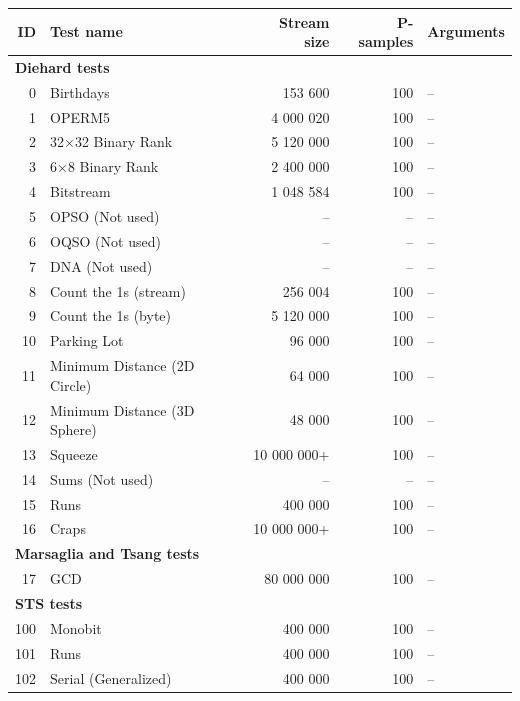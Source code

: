 \documentclass[
  digital,  	%
  color,		%
  oneside,   	%
  12pt,
  nocover,
  notable,
  nolof,
  nolot,
]{fithesis3}
\begin{document}
\begin{nomar}
\centering
\begin{tabular}{r | l | r | r | l}
\textbf{ID} & \textbf{Test name} & \textbf{Stream size} & \textbf{P-samples} & \textbf{Arguments} \\ \hline \hline
\multicolumn{5}{l}{\textbf{Diehard tests}} \\ \hline
0   & Birthdays                    &    153 600 & 100 & -- \\
1   & OPERM5                       &  4 000 020 & 100 & -- \\
2   & 32$\times$32 Binary Rank     &  5 120 000 & 100 & -- \\
3   & 6$\times$8 Binary Rank       &  2 400 000 & 100 & -- \\
4   & Bitstream                    &  1 048 584 & 100 & -- \\
5   & OPSO (Not used)              &         -- & --  & -- \\
6   & OQSO (Not used)              &         -- & --  & -- \\
7   & DNA  (Not used)              &         -- & --  & -- \\
8   & Count the 1s (stream)        &    256 004 & 100 & -- \\
9   & Count the 1s (byte)          &  5 120 000 & 100 & -- \\
10  & Parking Lot                  &     96 000 & 100 & -- \\
11  & Minimum Distance (2D Circle) &     64 000 & 100 & -- \\
12  & Minimum Distance (3D Sphere) &     48 000 & 100 & -- \\
13  & Squeeze 					   & 10 000 000+& 100 & -- \\
14  & Sums (Not used)              &         -- & --  & -- \\
15  & Runs                         &    400 000 & 100 & --\\
16  & Craps                        & 10 000 000+& 100 & --\\
\multicolumn{5}{l}{\textbf{Marsaglia and Tsang tests}} \\ \hline
17  & GCD & 80 000 000 & 100 & -- \\
\multicolumn{5}{l}{\textbf{STS tests}} \\ \hline
100 & Monobit              & 400 000 & 100 & -- \\
101 & Runs                 & 400 000 & 100 & -- \\
102 & Serial (Generalized) & 400 000 & 100 & -- \\

\end{tabular}
\end{nomar}
\end{document}
